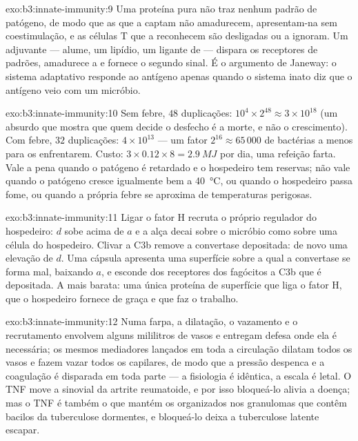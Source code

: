 \begin{solution}{exo:b3:innate-immunity:9}
Uma proteína pura não traz nenhum padrão de patógeno, de modo que as
 que a captam não amadurecem, apresentam-na sem
coestimulação, e as células T que a reconhecem são desligadas ou a
ignoram. Um adjuvante --- alume, um lipídio, um ligante de  --- dispara os receptores de padrões, amadurece a  e fornece o segundo sinal. É o argumento de Janeway: o
sistema adaptativo responde ao antígeno apenas quando o sistema inato
diz que o antígeno veio com um micróbio.
\end{solution}

\begin{solution}{exo:b3:innate-immunity:10}
Sem febre, $48$ duplicações: $10^{4}\times 2^{48} \approx 3\times
10^{18}$ (um absurdo que mostra que quem decide o desfecho é a morte, e
não o crescimento). Com febre, $32$ duplicações: $4\times 10^{13}$ ---
um fator $2^{16} \approx 65\,000$ de bactérias a menos para os
 enfrentarem. Custo: $3\times 0.12\times 8 = \qty{2.9}{MJ}$
por dia, uma refeição farta. Vale a pena quando o patógeno é retardado
e o hospedeiro tem reservas; não vale quando o patógeno cresce igualmente
bem a \qty{40}{\celsius}, ou quando o hospedeiro passa fome, ou quando a
própria febre se aproxima de temperaturas perigosas.
\end{solution}

\begin{solution}{exo:b3:innate-immunity:11}
Ligar o fator H recruta o próprio regulador do hospedeiro: $d$ sobe
acima de $a$ e a alça decai sobre o micróbio como sobre uma célula do
hospedeiro. Clivar a C3b remove a convertase depositada: de novo uma
elevação de $d$. Uma cápsula apresenta uma superfície sobre a qual a
convertase se forma mal, baixando $a$, e esconde dos receptores dos
fagócitos a C3b que é depositada. A mais barata: uma única proteína de
superfície que liga o fator H, que o hospedeiro fornece de graça e que
faz o trabalho.
\end{solution}

\begin{solution}{exo:b3:innate-immunity:12}
Numa farpa, a dilatação, o vazamento e o recrutamento envolvem alguns
mililitros de vasos e entregam defesa onde ela é necessária; os mesmos
mediadores lançados em toda a circulação dilatam todos os vasos e fazem
vazar todos os capilares, de modo que a pressão despenca e a coagulação
é disparada em toda parte --- a fisiologia é idêntica, a escala é
letal. O TNF move a  sinovial da artrite reumatoide, e por
isso bloqueá-lo alivia a doença; mas o TNF é também o que mantém os
 organizados nos granulomas que contêm bacilos da tuberculose
dormentes, e bloqueá-lo deixa a tuberculose latente escapar.
\end{solution}

